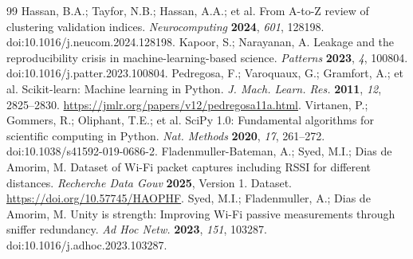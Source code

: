 \begin{thebibliography}{99}
 Hassan, B.A.; Tayfor, N.B.; Hassan, A.A.; et al. From A-to-Z review of clustering validation indices. \emph{Neurocomputing} \textbf{2024}, \emph{601}, 128198. doi:10.1016/j.neucom.2024.128198.
 Kapoor, S.; Narayanan, A. Leakage and the reproducibility crisis in machine-learning-based science. \emph{Patterns} \textbf{2023}, \emph{4}, 100804. doi:10.1016/j.patter.2023.100804.
 Pedregosa, F.; Varoquaux, G.; Gramfort, A.; et al. Scikit-learn: Machine learning in Python. \emph{J. Mach. Learn. Res.} \textbf{2011}, \emph{12}, 2825--2830. \url{https://jmlr.org/papers/v12/pedregosa11a.html}.
 Virtanen, P.; Gommers, R.; Oliphant, T.E.; et al. SciPy 1.0: Fundamental algorithms for scientific computing in Python. \emph{Nat. Methods} \textbf{2020}, \emph{17}, 261--272. doi:10.1038/s41592-019-0686-2.
 Fladenmuller-Bateman, A.; Syed, M.I.; Dias de Amorim, M. Dataset of Wi-Fi packet captures including RSSI for different distances. \emph{Recherche Data Gouv} \textbf{2025}, Version 1. Dataset. \url{https://doi.org/10.57745/HAOPHF}.
 Syed, M.I.; Fladenmuller, A.; Dias de Amorim, M. Unity is strength: Improving Wi-Fi passive measurements through sniffer redundancy. \emph{Ad Hoc Netw.} \textbf{2023}, \emph{151}, 103287. doi:10.1016/j.adhoc.2023.103287.
\end{thebibliography}
